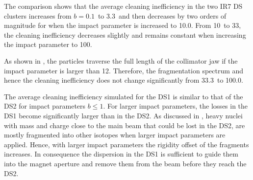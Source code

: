 The comparison shows that the average cleaning inefficiency in the two IR7 DS clusters increases from $b=0.1$\mum\, to 3.3\mum\, and then decreases by two orders of magnitude for when the impact parameter is increased to 10.0\mum. From 10\mum\, to 33\mum, the cleaning inefficiency decreases slightly and remains constant when increasing the impact parameter to 100\mum.

\newpage
As shown in , the particles traverse the full length of the collimator jaw if the impact parameter is larger than 12\mum. Therefore, the fragmentation spectrum and hence the cleaning inefficiency does not change significantly from 33.3\mum\, to 100.0\mum. 

The average cleaning inefficiency simulated for the DS1 is similar to that of the DS2 for impact parameters $b\leq 1$\mum. For larger impact parameters, the losses in the DS1 become significantly larger than in the DS2. As discussed in , heavy nuclei with mass and charge close to the main beam that could be lost in the DS2, are mostly fragmented into other isotopes when larger impact parameters are applied. Hence, with larger impact parameters the rigidity offset of the fragments increases. In consequence the dispersion in the DS1 is sufficient to guide them into the magnet aperture and remove them from the beam before they reach the DS2.  




